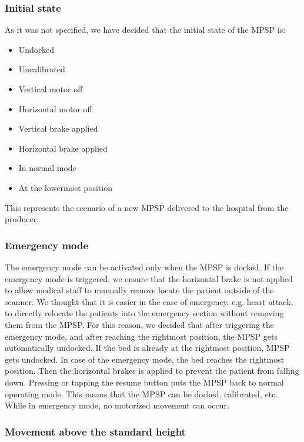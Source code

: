 
\subsubsection{Initial state}

As it was not specified, we have decided that the initial state of the MPSP is:
\begin{itemize}
    \item Undocked
    \item Uncalibrated
    \item Vertical motor off
    \item Horizontal motor off
    \item Vertical brake applied
    \item Horizontal brake applied
    \item In normal mode
    \item At the lowermost position
\end{itemize}
This represents the scenario of a new MPSP delivered to the hospital
from the producer.

\subsubsection{Emergency mode}

The emergency mode can be activated only when the MPSP is docked.
If the emergency mode is triggered, we ensure that the horizontal
brake is not applied to allow medical staff to manually
remove locate the patient outside of the scanner. We thought that it is easier in the case of emergency, e.g. heart attack, to directly relocate the patients into the emergency section without removing them from the MPSP. For this reason, we decided that after triggering the emergency mode,
and after reaching the rightmost position,
the MPSP gets automatically undocked.
If the bed is already at the rightmost position, MPSP gets undocked. In case of the emergency mode, the bed reaches the rightmost position. Then the horizontal brakes is applied to prevent the patient from falling down.
Pressing or tapping the resume button puts the MPSP back to normal operating
mode.
This means that the MPSP can be docked, calibrated, etc.
While in emergency mode, no motorized movement can occur.

\subsubsection{Movement above the standard height}

